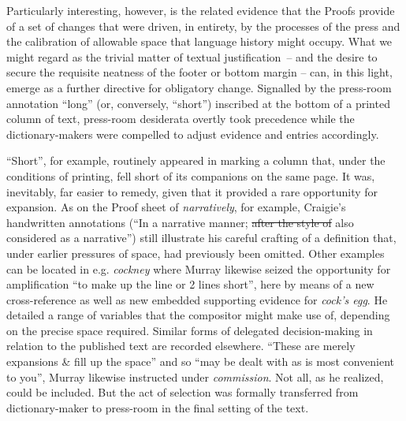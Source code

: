 \documentclass[output=paper,colorlinks,citecolor=brown,arabicfont,chinesefont]{langscibook}
\begin{document}
Particularly interesting, however, is the related evidence that the Proofs provide of a set of changes that were driven, in entirety, by the processes of the press and the calibration of allowable space that language history might occupy. What we might regard as the trivial matter of textual justification~-- and the desire to secure the requisite neatness of the footer or bottom margin – can, in this light, emerge as a further directive for obligatory change. Signalled by the press-room annotation “long” (or, conversely, “short”) inscribed at the bottom of a printed column of text, press-room desiderata overtly took precedence while the dictionary-makers were compelled to adjust evidence and entries accordingly. 

“Short”, for example, routinely appeared in marking a column that, under the conditions of printing, fell short of its companions on the same page. It was, inevitably, far easier to remedy, given that it provided a rare opportunity for expansion. As on the Proof sheet of \emph{narratively}, for example, Craigie’s handwritten annotations (“In a narrative manner; \sout{after the style of} also considered as a narrative”) still illustrate his careful crafting of a definition that, under earlier pressures of space, had previously been omitted. Other examples can be located in e.g. \emph{cockney} where Murray likewise seized the opportunity for amplification “to make up the line or 2 lines short”, here by means of a new cross-reference as well as new embedded supporting evidence for \emph{cock’s egg}. He detailed a range of variables that the compositor might make use of, depending on the precise space required. Similar forms of delegated decision-making in relation to the published text are recorded elsewhere. “These are merely expansions \& fill up the space” and so “may be dealt with as is most convenient to you”, Murray likewise instructed under \emph{commission}. Not all, as he realized, could be included. But the act of selection was formally transferred from dictionary\hyp maker to press-room in the  final setting of the text. 
\end{document}
